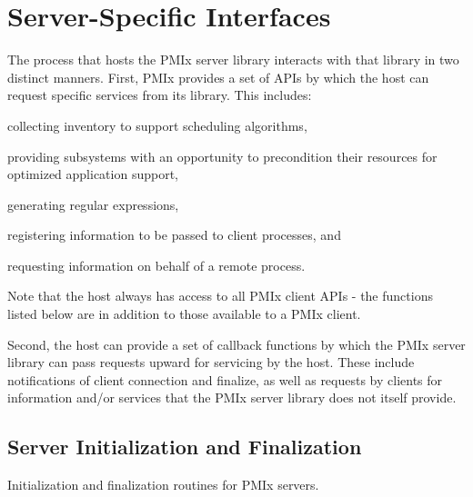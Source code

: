 \chapter{Server-Specific Interfaces}
\label{chap:api_server}

The process that hosts the \ac{PMIx} server library interacts with that library in two distinct manners. First, \ac{PMIx} provides a set of \acp{API} by which the host can request specific services from its library. This includes:

\begin{compactitemize}
    \item collecting inventory to support scheduling algorithms,
    \item providing subsystems with an opportunity to precondition their resources for optimized application support,
    \item generating regular expressions,
    \item registering information to be passed to client processes, and
    \item requesting information on behalf of a remote process.
\end{compactitemize}

Note that the host always has access to all \ac{PMIx} client \acp{API} - the functions listed below are in addition to those available to a \ac{PMIx} client.

Second, the host can provide a set of callback functions by which the \ac{PMIx} server library can pass requests upward for servicing by the host. These include notifications of client connection and finalize, as well as requests by clients for information and/or services that the \ac{PMIx} server library does not itself provide.

\section{Server Initialization and Finalization}
\label{chap:api_init:server}

Initialization and finalization routines for \ac{PMIx} servers.

\subsection{}

